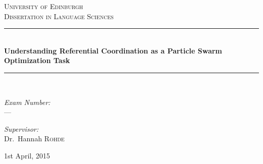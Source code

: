 \documentclass[12pt,a4paper]{article}
\newcommand{\HRule}{\rule{\linewidth}{0.5mm}}
\begin{document}
\begin{titlepage}

\begin{center}

\textsc{\LARGE University of Edinburgh}\\[1cm]

\textsc{\Large Dissertation in Language Sciences}\\[1.5cm]

\HRule \\[0.4cm]
{ \huge \bfseries Understanding Referential Coordination as a Particle Swarm Optimization Task \\[0.4cm] }

\HRule \\[1.5cm]


\noindent
\begin{minipage}{0.4\textwidth}
\begin{flushleft} \large
\emph{Exam Number:}\\
---
\end{flushleft}
\end{minipage}%
\begin{minipage}{0.4\textwidth}
\begin{flushright} \large
\emph{Supervisor:} \\
Dr.~Hannah \textsc{Rohde}
\end{flushright}
\end{minipage}

\vfill

{\large 1st April, 2015}


\end{center}
\end{titlepage}

\onehalfspace

\begin{abstract}
Particle swarm optimization (PSO) has been proposed as a means of modeling changes in human behaviour in a social context. PSO has also been shown to be an effective optimization method for non-differentiable problems with continuous search spaces, and has seen widespread use as such. In this paper, the language game presented in \citeauthor{rohde2012}'s ``Communicating with Cost-based Implicature: a Game-Theoretic Approach to Ambiguity" is modeled as a particle swarm optimization task, with the aim of creating a system which captures the results seen in \citeauthor{rohde2012}'s experiments. Two such possible systems are presented, one of which is successful in modeling these results. Further to this, PSO's suitability for use in language games with highly dynamic objective functions, how we might frame PSO's behaviour from game-theoretic and psycholinguistic standpoints, and predictions made by the successful PSO-based model are also discussed.
\end{abstract}
\end{document}
